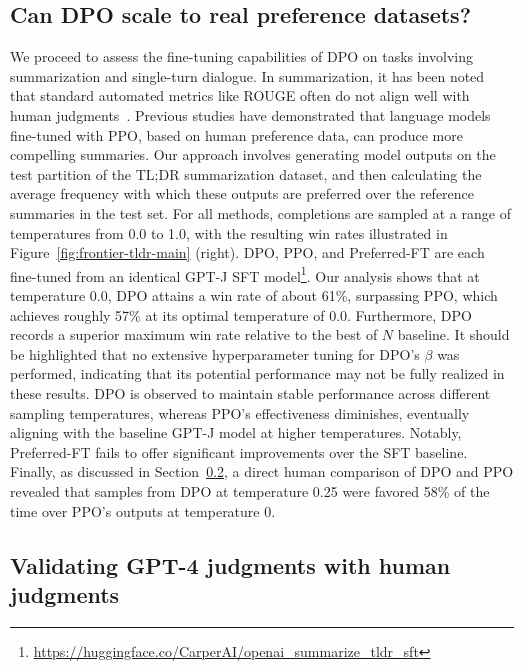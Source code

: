 \subsection{Can DPO scale to real preference datasets?}
\label{sec:dpo-real-datasets}
We proceed to assess the fine-tuning capabilities of DPO on tasks involving summarization and single-turn dialogue. In summarization, it has been noted that standard automated metrics like ROUGE often do not align well with human judgments~\citep{stiennon2022learning}. Previous studies have demonstrated that language models fine-tuned with PPO, based on human preference data, can produce more compelling summaries. Our approach involves generating model outputs on the test partition of the TL;DR summarization dataset, and then calculating the average frequency with which these outputs are preferred over the reference summaries in the test set. For all methods, completions are sampled at a range of temperatures from 0.0 to 1.0, with the resulting win rates illustrated in Figure~\ref{fig:frontier-tldr-main} (right). DPO, PPO, and Preferred-FT are each fine-tuned from an identical GPT-J SFT model\footnote{\url{https://huggingface.co/CarperAI/openai_summarize_tldr_sft}}. Our analysis shows that at temperature 0.0, DPO attains a win rate of about 61\%, surpassing PPO, which achieves roughly 57\% at its optimal temperature of 0.0. Furthermore, DPO records a superior maximum win rate relative to the best of $N$ baseline. It should be highlighted that no extensive hyperparameter tuning for DPO’s $\beta$ was performed, indicating that its potential performance may not be fully realized in these results. DPO is observed to maintain stable performance across different sampling temperatures, whereas PPO’s effectiveness diminishes, eventually aligning with the baseline GPT-J model at higher temperatures. Notably, Preferred-FT fails to offer significant improvements over the SFT baseline. Finally, as discussed in Section~\ref{sec:human-judgments}, a direct human comparison of DPO and PPO revealed that samples from DPO at temperature 0.25 were favored 58\% of the time over PPO’s outputs at temperature 0.

\subsection{Validating GPT-4 judgments with human judgments}
\label{sec:human-judgments}

